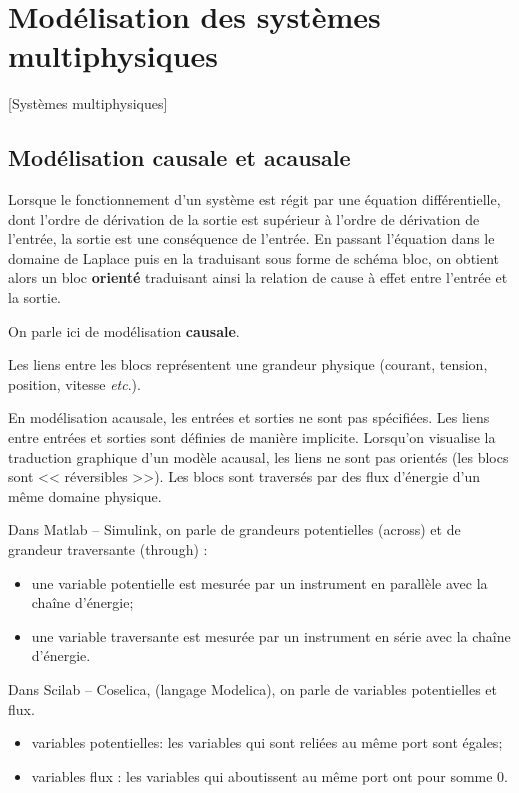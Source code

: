 
\section{Modélisation des systèmes multiphysiques}[Systèmes multiphysiques]
\subsection{Modélisation causale et acausale}

Lorsque le fonctionnement d'un système est régit par une équation différentielle, dont l'ordre de dérivation de la sortie est supérieur à l'ordre de dérivation de l'entrée, la sortie est une conséquence de l'entrée. En passant l'équation dans le domaine de Laplace puis en la traduisant sous forme de schéma bloc, on obtient alors un bloc \textbf{orienté} traduisant ainsi la relation de cause à effet entre l'entrée et la sortie. 

On parle ici de modélisation \textbf{causale}. 

Les liens entre les blocs représentent une grandeur physique (courant, tension, position, vitesse \textit{etc}.).


En modélisation acausale, les entrées et sorties ne sont pas spécifiées. Les liens entre entrées et sorties sont définies de manière implicite. Lorsqu'on visualise la traduction graphique d'un modèle acausal, les liens ne sont pas orientés (les blocs sont << réversibles >>). Les blocs sont traversés par des flux d'énergie d'un même domaine physique.  

Dans Matlab -- Simulink, on parle de grandeurs potentielles (across) et de grandeur traversante (through) : 
\begin{itemize}
\item une variable potentielle est mesurée par un instrument
en parallèle avec la chaîne d’énergie;
\item une variable traversante est mesurée par un instrument
en série avec la chaîne d’énergie.
\end{itemize}

Dans Scilab -- Coselica, (langage Modelica), on parle de variables potentielles et flux.
\begin{itemize}
\item variables potentielles: les variables qui sont reliées au même port sont égales;
\item variables flux : les variables qui aboutissent au
même port ont pour somme 0.
\end{itemize}



